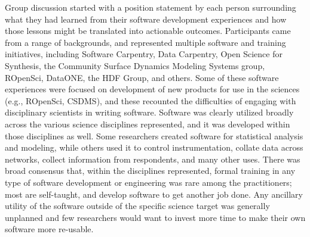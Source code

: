 \documentclass[11pt, oneside]{amsart}
\begin{document}
Group discussion started with a position statement by each person surrounding
what they had learned from their software development experiences and how those
lessons might be translated into actionable outcomes. Participants came from a
range of backgrounds, and represented multiple software and training
initiatives, including Software Carpentry, Data Carpentry, Open Science for
Synthesis, the Community Surface Dynamics Modeling Systems group, ROpenSci,
DataONE, the HDF Group, and others. Some of these software experiences were
focused on development of new products for use in the sciences (e.g., ROpenSci,
CSDMS), and these recounted the difficulties of engaging with disciplinary
scientists in writing software. Software was clearly utilized broadly across the
various science disciplines represented, and it was developed within those
disciplines as well. Some researchers created software for statistical analysis
and modeling, while others used it to control instrumentation, collate data
across networks, collect information from respondents, and many other uses.
There was broad consensus that, within the disciplines represented, formal
training in any type of software development or engineering was rare among the
practitioners; most are self-taught, and develop software to get another job
done. Any ancillary utility of the software outside of the specific science
target was generally unplanned and few researchers would want to invest more
time to make their own software more re-usable.
\end{document}
